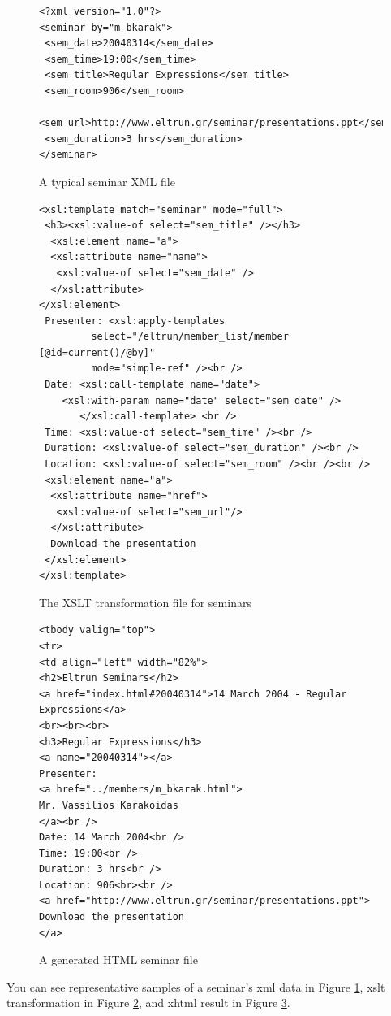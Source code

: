 \documentclass[10pt]{article}
\begin{document}
\begin{figure}
\begin{verbatim}
<?xml version="1.0"?>
<seminar by="m_bkarak">
 <sem_date>20040314</sem_date>
 <sem_time>19:00</sem_time>
 <sem_title>Regular Expressions</sem_title>
 <sem_room>906</sem_room>
 <sem_url>http://www.eltrun.gr/seminar/presentations.ppt</sem_url>
 <sem_duration>3 hrs</sem_duration>
</seminar>
\end{verbatim}
\caption{A typical seminar XML file}
\label{fig:project-xml}
\end{figure}

\begin{figure}
\begin{verbatim}
<xsl:template match="seminar" mode="full">
 <h3><xsl:value-of select="sem_title" /></h3>
  <xsl:element name="a">
  <xsl:attribute name="name">
   <xsl:value-of select="sem_date" />
  </xsl:attribute>
</xsl:element>
 Presenter: <xsl:apply-templates 
 	     select="/eltrun/member_list/member [@id=current()/@by]" 
	     mode="simple-ref" /><br />
 Date: <xsl:call-template name="date">
	<xsl:with-param name="date" select="sem_date" />
       </xsl:call-template> <br />
 Time: <xsl:value-of select="sem_time" /><br />
 Duration: <xsl:value-of select="sem_duration" /><br />
 Location: <xsl:value-of select="sem_room" /><br /><br />
 <xsl:element name="a">
  <xsl:attribute name="href">
   <xsl:value-of select="sem_url"/>
  </xsl:attribute>
  Download the presentation
 </xsl:element>
</xsl:template>
\end{verbatim}
\caption{The XSLT transformation file for seminars}
\label{fig:project-xslt}
\end{figure}

\begin{figure}
\begin{verbatim}
<tbody valign="top">
<tr>
<td align="left" width="82%">
<h2>Eltrun Seminars</h2>
<a href="index.html#20040314">14 March 2004 - Regular Expressions</a>
<br><br><br>
<h3>Regular Expressions</h3>
<a name="20040314"></a>
Presenter: 
<a href="../members/m_bkarak.html">
Mr. Vassilios Karakoidas
</a><br />
Date: 14 March 2004<br />
Time: 19:00<br />
Duration: 3 hrs<br />
Location: 906<br><br />
<a href="http://www.eltrun.gr/seminar/presentations.ppt">
Download the presentation
</a>
\end{verbatim}
\caption{A generated HTML seminar file}
\label{fig:project-html}
\end{figure}

You can see representative samples of a seminar's
{\sc xml} data in Figure \ref{fig:project-xml},
{\sc xslt} transformation in Figure \ref{fig:project-xslt},
and {\sc xhtml} result in Figure \ref{fig:project-html}.
\end{document}
